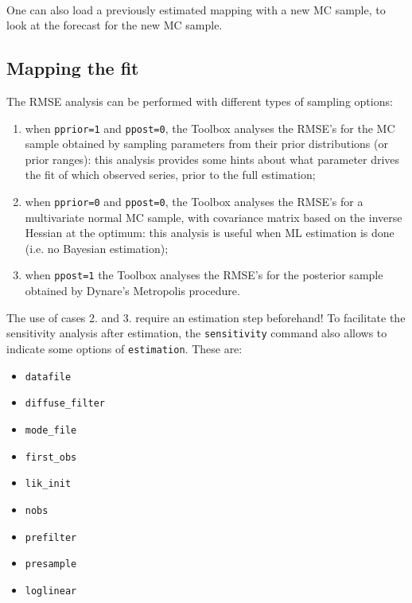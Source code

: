 \documentclass[12pt,a4paper]{article}
\begin{document}
\vspace{0.5cm} \\

One can also load a previously estimated mapping
with a new MC sample, to look at the forecast for the new MC sample.\\

\subsection{Mapping the fit}
The RMSE analysis can be performed with different types of
sampling options:
\begin{enumerate}
\item when \verb"pprior=1" and \verb"ppost=0", the Toolbox analyses the RMSE's for
the MC sample obtained by sampling parameters from their prior
distributions (or prior ranges): this analysis provides some hints
about what parameter drives the fit of which observed series,
prior to the full estimation;
\item when \verb"pprior=0" and \verb"ppost=0", the Toolbox analyses the RMSE's for
a multivariate normal MC sample, with covariance matrix based on
the inverse Hessian at the optimum: this analysis is useful when
ML estimation is done (i.e. no Bayesian estimation);
\item when \verb"ppost=1" the Toolbox analyses
the RMSE's for the posterior sample obtained by Dynare's
Metropolis procedure.
\end{enumerate}

The use of cases 2. and 3. require an estimation step beforehand!
To facilitate the sensitivity analysis after estimation, the
\verb"sensitivity" command also allows to indicate some
options of \verb"estimation". These are:
\begin{itemize}
  \item \verb"datafile"
  \item \verb"diffuse_filter"
  \item \verb"mode_file"
  \item \verb"first_obs"
  \item \verb"lik_init"
  \item \verb"nobs"
  \item \verb"prefilter"
  \item \verb"presample"
  \item \verb"loglinear"
\end{itemize}


 \vspace{1cm}
\end{document}

